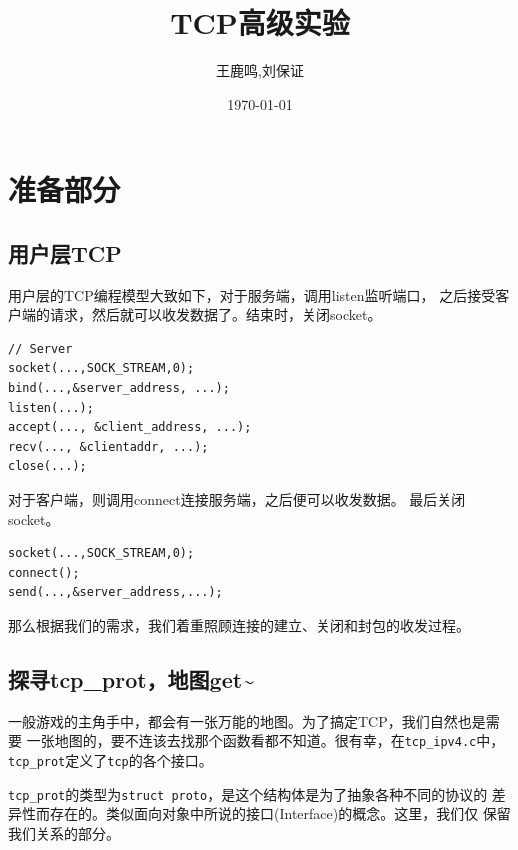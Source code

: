 \documentclass[11pt, a4paper,oneside]{book}
\theoremstyle{ocrenumbox}
\theoremstyle{purplenumbox}
\theoremstyle{blackbox}
\begin{document}
\pagestyle{empty} %
\title{TCP高级实验}
\author{王鹿鸣,刘保证}
\date{\today}
\maketitle
\setcounter{secnumdepth}{3}
\frontmatter
\tableofcontents

\mainmatter
\pagestyle{fancy}
\chapter{准备部分}

\minitoc

\section{用户层TCP}

用户层的TCP编程模型大致如下，对于服务端，调用listen监听端口，
之后接受客户端的请求，然后就可以收发数据了。结束时，关闭socket。

\begin{verbatim}
// Server
socket(...,SOCK_STREAM,0);
bind(...,&server_address, ...);
listen(...);
accept(..., &client_address, ...);
recv(..., &clientaddr, ...);
close(...);
\end{verbatim}

对于客户端，则调用connect连接服务端，之后便可以收发数据。
最后关闭socket。

\begin{verbatim}
socket(...,SOCK_STREAM,0);
connect();
send(...,&server_address,...);
\end{verbatim}

那么根据我们的需求，我们着重照顾连接的建立、关闭和封包的收发过程。

\section{探寻tcp\_prot，地图get\textasciitilde{}}

一般游戏的主角手中，都会有一张万能的地图。为了搞定TCP，我们自然也是需要
一张地图的，要不连该去找那个函数看都不知道。很有幸，在\texttt{tcp_ipv4.c}中，
\texttt{tcp_prot}定义了\texttt{tcp}的各个接口。

\texttt{tcp_prot}的类型为\texttt{struct proto}，是这个结构体是为了抽象各种不同的协议的
差异性而存在的。类似面向对象中所说的接口(Interface)的概念。这里，我们仅
保留我们关系的部分。
\end{document}
